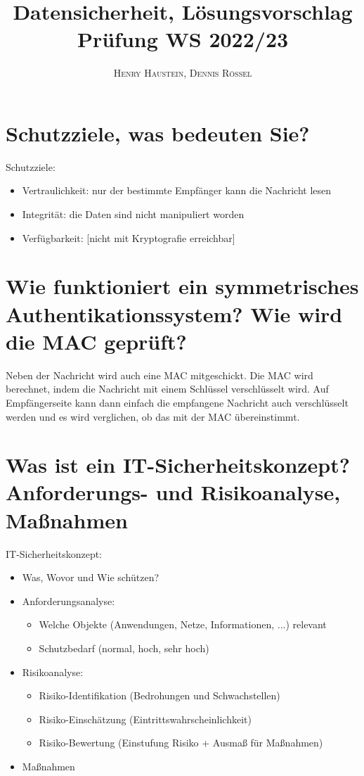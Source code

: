 \documentclass{article}
\title{\textbf{Datensicherheit, Lösungsvorschlag Prüfung WS 2022/23}}
\author{\textsc{Henry Haustein}, \textsc{Dennis Rössel}}
\date{}
\begin{document}
	\maketitle
	
	\section*{Schutzziele, was bedeuten Sie?}
	Schutzziele:
	\begin{itemize}
		\item Vertraulichkeit: nur der bestimmte Empfänger kann die Nachricht lesen
		\item Integrität: die Daten sind nicht manipuliert worden
		\item Verfügbarkeit: [nicht mit Kryptografie erreichbar]
	\end{itemize}
	
	\section*{Wie funktioniert ein symmetrisches Authentikationssystem? Wie wird die MAC geprüft?}
	Neben der Nachricht wird auch eine MAC mitgeschickt. Die MAC wird berechnet, indem die Nachricht mit einem Schlüssel verschlüsselt wird. Auf Empfängerseite kann dann einfach die empfangene Nachricht auch verschlüsselt werden und es wird verglichen, ob das mit der MAC übereinstimmt.
	
	\section*{Was ist ein IT-Sicherheitskonzept? Anforderungs- und Risikoanalyse, Maßnahmen}
	IT-Sicherheitskonzept:
	\begin{itemize}
		\item Was, Wovor und Wie schützen?
		\item Anforderungsanalyse:
		\begin{itemize}
			\item Welche Objekte (Anwendungen, Netze, Informationen, ...) relevant
			\item Schutzbedarf (normal, hoch, sehr hoch)
		\end{itemize}
		\item Risikoanalyse:
		\begin{itemize}
			\item Risiko-Identifikation (Bedrohungen und Schwachstellen)
			\item Risiko-Einschätzung (Eintrittswahrscheinlichkeit)
			\item Risiko-Bewertung (Einstufung Risiko + Ausmaß für Maßnahmen)
		\end{itemize}
		\item Maßnahmen
	\end{itemize}
	
\end{document}

